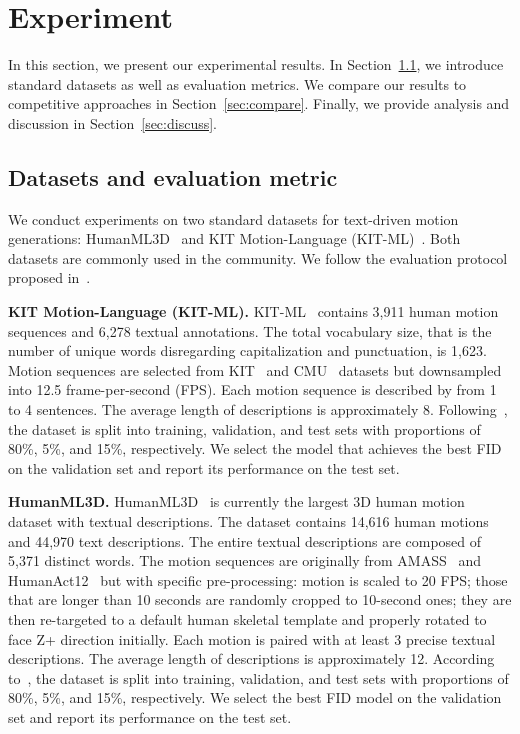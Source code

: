 \documentclass[10pt,twocolumn,letterpaper]{article}
\begin{document}
\section{Experiment}
\label{sec:exp}
In this section, we present our experimental results. In Section~\ref{sec:data}, we introduce standard datasets as well as evaluation metrics. We compare our results to competitive approaches in Section~\ref{sec:compare}. Finally, we provide analysis and discussion in Section~\ref{sec:discuss}.

\subsection{Datasets and evaluation metric}
\label{sec:data}
We conduct experiments on two standard datasets for text-driven motion generations: HumanML3D~\cite{guo2022generating} and KIT Motion-Language (KIT-ML)~\cite{plappert2016kit}. Both datasets are commonly used in the community. We follow the evaluation protocol proposed in~\cite{guo2022generating}.

\noindent\textbf{KIT Motion-Language (KIT-ML).} KIT-ML~\cite{plappert2016kit} contains 3,911 human motion sequences and 6,278 textual annotations. The total vocabulary size, that is the number of unique words disregarding capitalization and punctuation, is 1,623. Motion sequences are selected from KIT~\cite{mandery2015kit} and CMU~\cite{cmu} datasets but downsampled into 12.5 frame-per-second (FPS). Each motion sequence is described by from 1 to 4 sentences. The average length of descriptions is approximately 8. Following~\cite{guo2022generating,chuan2022tm2t}, the dataset is split into training, validation, and test sets with proportions of 80\%, 5\%, and 15\%, respectively. We select the model that achieves the best FID on the validation set and report its performance on the test set.

\noindent\textbf{HumanML3D.} HumanML3D~\cite{guo2022generating} is currently the largest 3D human motion dataset with textual descriptions. The dataset contains 14,616 human motions and 44,970 text descriptions. The entire textual descriptions are composed of  5,371 distinct words. The motion sequences are originally from AMASS~\cite{mahmood2019amass} and HumanAct12~\cite{guo2020action2motion} but with specific pre-processing: motion is scaled to 20 FPS; those that are longer than 10 seconds are randomly cropped to 10-second ones; they are then re-targeted to a default human skeletal template and properly rotated to face Z+ direction initially. Each motion is paired with at least 3 precise textual descriptions. The average length of descriptions is approximately 12. According to~\cite{guo2022generating}, the dataset is split into training, validation, and test sets with proportions of 80\%, 5\%, and 15\%, respectively. 
We select the best FID model on the validation set and report its performance on the test set.
\end{document}
